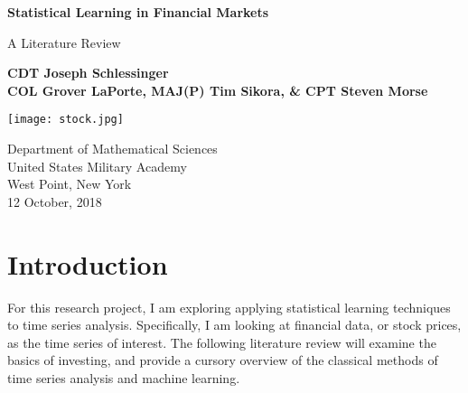 \documentclass[12pt]{article}
\begin{document}

\begin{titlepage}
	\begin{center}
		\vspace*{1cm}
		
		\textbf{\large Statistical Learning in Financial Markets}
		
		\vspace{0.5cm}
		A Literature Review
		
		\vspace{1.5cm}
		
		\textbf{CDT Joseph Schlessinger \\ COL Grover LaPorte, MAJ(P) Tim Sikora, \& CPT Steven Morse}
		
		\vfill
		
		
		\vspace{0.8cm}
		
		\texttt{[image: stock.jpg]}
		
		\vfill 
		Department of Mathematical Sciences\\
		United States Military Academy\\
		West Point, New York\\
		12 October, 2018
		
	\end{center}
\end{titlepage}

\tableofcontents
\newpage 
\section{Introduction}
For this research project, I am exploring applying statistical learning techniques to time series analysis. Specifically, I am looking at financial data, or stock prices, as the time series of interest. The following literature review will examine the basics of investing, and provide a cursory overview of the classical methods of time series analysis and machine learning.
\end{document}
